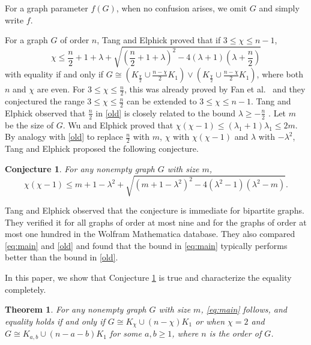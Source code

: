 \documentclass[10pt,a4paper]{amsart}
\newtheorem{theorem}{Theorem}%
\newtheorem{conjecture}{Conjecture}
\begin{document}
For a graph parameter $f(G)$, when no confusion arises, we omit $G$ and simply write $f$. 

For a graph $G$ of order $n$, Tang and Elphick proved that if $3\le \chi\le n-1$, 
\begin{equation}\label{old}
\chi\le \frac{n}{2}+1+\lambda
 + \sqrt{\left(\frac{n}{2}+1+\lambda\right)^2-4(\lambda+1)\left(\lambda+\frac{n}{2}\right)}
\end{equation}
with equality if and only if $G\cong (K_{\frac{\chi}{2}}\cup \frac{n-\chi}{2}K_1)\vee (K_{\frac{\chi}{2}}\cup \frac{n-\chi}{2}K_1)$, where both $n$ and $\chi$ are even. For  $3\le \chi\le \frac{n}{2}$, this was already proved by Fan et al.~\cite{FYW} and they conjectured the range $3\le \chi\le \frac{n}{2}$ can be  extended to  $3\le \chi\le n-1$.  
Tang and Elphick observed that $\frac{n}{2}$ in \eqref{old} is closely related to the bound $\lambda\ge -\frac{n}{2}$ \cite{Con,Pow}. Let $m$ be the size of $G$. Wu and Elphick \cite{WuElphick} proved that
$\chi(\chi-1)\le (\lambda_1+1)\lambda_1\le 2m$. By analogy with \eqref{old} to replace $\frac{n}{2}$ with $m$, $\chi$ with $\chi(\chi-1)$ and $\lambda$ with $-\lambda^2$, Tang and Elphick \cite{TangElphick} proposed the following conjecture. 

\begin{conjecture} \label{con} \cite[Conjecture~8]{TangElphick}
For any nonempty graph $G$ with size $m$,
\begin{equation}\label{eq:main}
\chi(\chi-1) \le m+1-\lambda^2
 + \sqrt{(m+1-\lambda^2)^2-4(\lambda^2-1)(\lambda^2-m)}.
\end{equation}
\end{conjecture}

Tang and Elphick observed that the conjecture is immediate for bipartite graphs. They  verified it for all graphs of order at most nine and for the graphs of order at most one hundred in the Wolfram Mathematica database.
They also compared \eqref{eq:main} and \eqref{old} and found that the bound in \eqref{eq:main} typically performs better than the bound in \eqref{old}.


In this paper, we show that Conjecture \ref{con} is true and characterize the equality completely.


\begin{theorem}\label{X}
For any nonempty graph $G$ with size $m$, \eqref{eq:main} follows, and  
equality holds  if and only if $G\cong K_\chi\cup (n-\chi)K_1$ or when $\chi=2$ and $G\cong K_{a,b}\cup (n-a-b)K_1$ for some  $a,b\ge 1$, where $n$ is the order of $G$.
\end{theorem}
\end{document}
